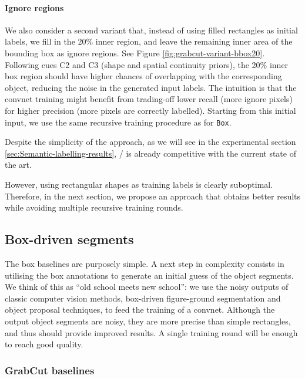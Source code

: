\documentclass[10pt,english,british,twocolumn]{article}
\begin{document}
\paragraph{Ignore regions}

We also consider a second variant  that, instead
of using filled rectangles as initial labels, we fill in the 20\%
inner region, and leave the remaining inner area of the bounding box
as ignore regions. See Figure \ref{fig:grabcut-variant-bbox20}. Following
cues C2 and C3 (shape and spatial continuity priors), the 20\% inner
box region should have higher chances of overlapping with the corresponding
object, reducing the noise in the generated input labels. The intuition
is that the convnet training might benefit from trading-off lower
recall (more ignore pixels) for higher precision (more pixels are
correctly labelled). Starting from this initial input, we use the
same recursive training procedure as for \texttt{Box}.

Despite the simplicity of the approach, as we will see in the experimental
section \ref{sec:Semantic-labelling-results},  / 
is already competitive with the current state of the art.

However, using rectangular shapes as training labels is clearly suboptimal.
Therefore, in the next section, we propose an approach that obtains
better results while avoiding multiple recursive training rounds.

\subsection{\label{subsec:GrabCut-baselines}Box-driven segments}

The box baselines are purposely simple. A next step in complexity
consists in utilising the box annotations to generate an initial guess
of the object segments. We think of this as ``old school meets new
school'': we use the noisy outputs of classic computer vision methods,
box-driven figure-ground segmentation \cite{Rother2004TogGrabcut}
and object proposal \cite{PontTuset2015Iccv} techniques, to feed
the training of a convnet. Although the output object segments are
noisy, they are more precise than simple rectangles, and thus should
provide improved results. A single training round will be enough to
reach good quality.

\subsubsection{GrabCut baselines}
\end{document}
